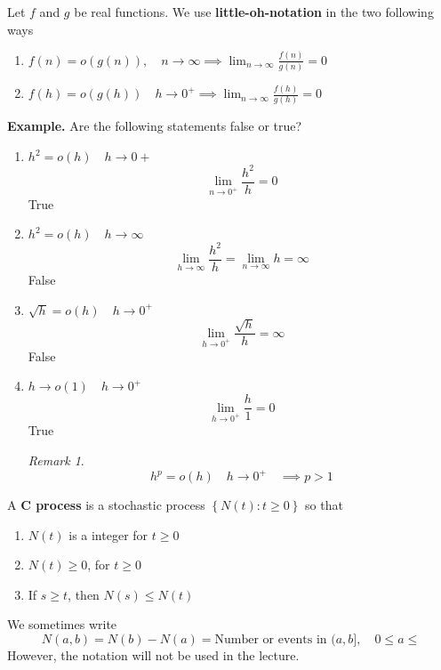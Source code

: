 \documentclass{article}
\theoremstyle{remark}
\newtheorem*{remark}{Remark}
\begin{document}
\begin{definition}
  Let $f$ and $g$ be real functions. We use \textbf{little-oh-notation}  in the two following ways 
  \begin{enumerate}[label=(\roman*)]
    \item $\displaystyle f\left( n \right) = o\left( g\left( n \right) \right) , \quad  n\to \infty \implies  \lim_{n\to \infty} \frac{f\left( n \right)}{g\left( n \right) }  = 0 $ 
    \item $\displaystyle f\left( h \right) = o\left( g\left( h \right) \right) \quad h\to 0^{+} \implies  \lim_{ n\to \infty } \frac{f\left( h \right)}{ g\left( h \right)} = 0    $
  \end{enumerate}
\end{definition}

\begin{tcolorbox}
  \textbf{Example.} Are the following statements false or true? 
  \begin{enumerate}[label=(\roman*)]
    \item $h^2 = o\left( h \right) \quad  h\to  0  + $ \[
    \lim_{n\to  0^{+}}  \frac{h^2}{h} = 0
    \] 
    True
    \item $h^2 = o\left( h \right) \quad  h \to  \infty $ \[
        \lim_{h \to  \infty}  \frac{h^2}{h} = \lim_{n \to \infty} h = \infty
    \] 
    False
    \item $\sqrt{h}  = o\left( h \right) \quad  h\to  0^{+} $ \[
    \lim_{h \to 0^{+}}  \frac{\sqrt{h} }{h}  = \infty
    \] 
    False
    \item $h\to  o\left( 1 \right)\quad h\to 0^{+} $ \[
    \lim_{h \to 0^{+}}  \frac{h}{1 }  = 0
    \] 
    True

    \begin{remark}
      \[
      h^{p} = o\left( h \right) \quad h \to 0^{+}\quad \implies p >1  
      \] 
    \end{remark}
  \end{enumerate}
\end{tcolorbox}

\newpage 
\begin{definition}
  A \textbf{C process}  is a stochastic process $\left\{ N\left( t \right) : t \ge 0 \right\}$ so that 
  \begin{enumerate}[label=(\roman*)]
    \item $N\left(  t \right)$ is a integer for $t\ge 0$
    \item $N\left( t \right) \ge 0$, for $t\ge0$
    \item If $s \ge t$, then $N\left( s \right) \le N\left( t \right)$
  \end{enumerate}
  We sometimes write \[
    N\left( a,b \right) = N\left( b \right) - N\left( a \right) = \text{Number or events in } (a,b] , \quad   0\le a \le 
  \] 
  However, the notation will not be used in the lecture. 
\end{definition}
\end{document}
